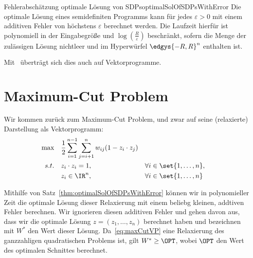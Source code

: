 \documentclass[language=ngerman,algolist]{TemplateLecture}
\begin{document}
\begin{thm}{Fehlerabschätzung optimale Lösung von SDPs}{optimalSolOfSDPsWithError}
    Die optimale Lösung eines semidefiniten Programms kann für jedes $\varepsilon > 0$ mit einem additiven Fehler von höchstens $\varepsilon$ berechnet werden. Die Laufzeit hierfür ist polynomiell in der Eingabegröße und $\log\left( \frac{R}{\varepsilon} \right)$ beschränkt, sofern die Menge der zulässigen Lösung nichtleer und im Hyperwürfel $\edgys{-R,R}^n$ enthalten ist.
\end{thm}

Mit~ überträgt sich dies auch auf Vektorprogramme.

\section{Maximum-Cut Problem}

Wir kommen zurück zum Maximum-Cut Problem, und zwar auf seine (relaxierte) Darstellung als Vektorprogramm:
\begin{equation}
    \begin{aligned}
        \max \quad & \frac{1}{2}\sum_{i = 1}^{n-1} \sum_{j = i + 1}^n w_{ij} (1 - z_i \cdot z_j) \\
        s.t. \quad & z_i \cdot z_i = 1, && \forall i \in \set{1, \ldots, n}, \\
        & z_i \in \IR^n, && \forall i \in \set{1,\ldots,n}
    \end{aligned}\label{eq:maxCutVP}
\end{equation}

Mithilfe von Satz~\ref{thm:optimalSolOfSDPsWithError} können wir in polynomieller Zeit die optimale Lösung dieser Relaxierung mit einem beliebg kleinen, addtiven Fehler berechnen. Wir ignorieren diesen additiven Fehler und gehen davon aus, dass wir die optimale Lösung $z = (z_1, \ldots, z_n)$ berechnet haben und bezeichnen mit $W^*$ den Wert dieser Lösung. Da~\eqref{eq:maxCutVP} eine Relaxierung des ganzzahligen quadratischen Problems ist, gilt $W^* \geq \OPT$, wobei $\OPT$ den Wert des optimalen Schnittes berechnet.
\end{document}
